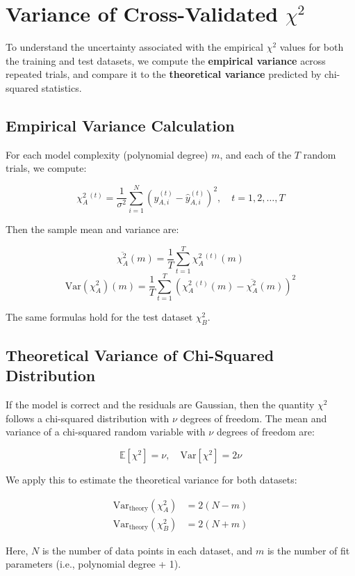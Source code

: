 \documentclass{article}
\begin{document}
\section*{Variance of Cross-Validated $\chi^2$}

To understand the uncertainty associated with the empirical $\chi^2$ values for both the training and test datasets, we compute the \textbf{empirical variance} across repeated trials, and compare it to the \textbf{theoretical variance} predicted by chi-squared statistics.

\subsection*{Empirical Variance Calculation}

For each model complexity (polynomial degree) $m$, and each of the $T$ random trials, we compute:

\[
\chi^2_A^{(t)} = \frac{1}{\sigma^2} \sum_{i=1}^N (y_{A,i}^{(t)} - \hat{y}_{A,i}^{(t)})^2, \quad t = 1, 2, \dots, T
\]

Then the sample mean and variance are:

\[
\overline{\chi^2_A}(m) = \frac{1}{T} \sum_{t=1}^T \chi^2_A^{(t)}(m)
\]
\[
\mathrm{Var}(\chi^2_A)(m) = \frac{1}{T} \sum_{t=1}^T \left( \chi^2_A^{(t)}(m) - \overline{\chi^2_A}(m) \right)^2
\]

The same formulas hold for the test dataset $\chi^2_B$.

\subsection*{Theoretical Variance of Chi-Squared Distribution}

If the model is correct and the residuals are Gaussian, then the quantity $\chi^2$ follows a chi-squared distribution with $\nu$ degrees of freedom. The mean and variance of a chi-squared random variable with $\nu$ degrees of freedom are:

\[
\mathbb{E}[\chi^2] = \nu, \quad \mathrm{Var}[\chi^2] = 2\nu
\]

We apply this to estimate the theoretical variance for both datasets:

\begin{align*}
\mathrm{Var}_{\text{theory}}(\chi^2_A) &= 2(N - m) \\
\mathrm{Var}_{\text{theory}}(\chi^2_B) &= 2(N + m)
\end{align*}

Here, $N$ is the number of data points in each dataset, and $m$ is the number of fit parameters (i.e., polynomial degree + 1).
\end{document}
